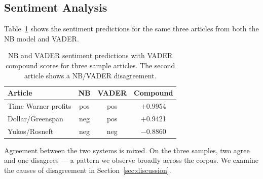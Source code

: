 \subsection{Sentiment Analysis}

Table~\ref{tab:sentiment} shows the sentiment predictions for the same three articles from both the NB model and VADER.

\begin{table}[h]
\centering
\begin{tabular}{lccc}
\toprule
\textbf{Article} & \textbf{NB} & \textbf{VADER} & \textbf{Compound} \\
\midrule
Time Warner profits & pos & pos & $+$0.9954 \\
Dollar/Greenspan    & neg & pos & $+$0.9421 \\
Yukos/Rosneft       & neg & neg & $-$0.8860 \\
\bottomrule
\end{tabular}
\caption{NB and VADER sentiment predictions with VADER compound scores for three sample articles. The second article shows a NB/VADER disagreement.}
\label{tab:sentiment}
\end{table}

Agreement between the two systems is mixed. On the three samples, two agree and one disagrees — a pattern we observe broadly across the corpus. We examine the causes of disagreement in Section~\ref{sec:discussion}.

